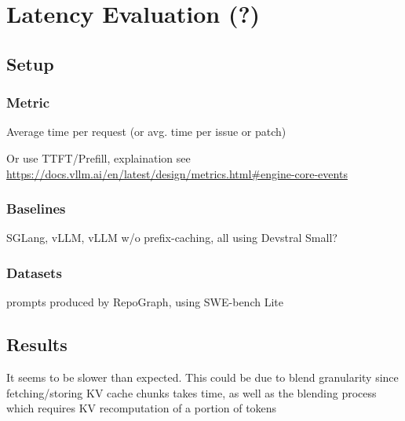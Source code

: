 \section{Latency Evaluation (?)}
\label{sec:ch3_eval2}
\subsection{Setup}
\subsubsection{Metric}
Average time per request (or avg. time per issue or patch)

Or use TTFT/Prefill, explaination see \url{https://docs.vllm.ai/en/latest/design/metrics.html#engine-core-events}
\subsubsection{Baselines}
SGLang, vLLM, vLLM w/o prefix-caching, all using Devstral Small?

\subsubsection{Datasets}

prompts produced by RepoGraph, using SWE-bench Lite

\subsection{Results}

It seems to be slower than expected. This could be due to blend granularity since fetching/storing KV cache chunks takes time, as well as the blending process which requires KV recomputation of a portion of tokens